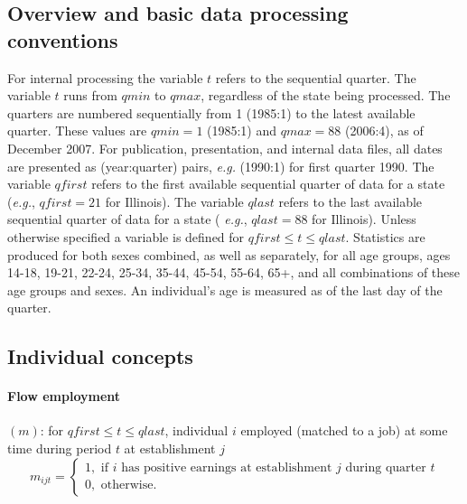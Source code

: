                       

%

\subsection{Overview and basic data processing conventions}

\label{sec:technical:overview}

 For internal processing the variable $t$ refers
to the sequential quarter. The variable $t$ runs from $qmin$ to $qmax$,
regardless of the state being processed. The quarters are numbered
sequentially from 1 (1985:1) to the latest available quarter. These values
are $qmin=1$ (1985:1) and $qmax=88$ (2006:4), as of December 2007. For
publication, presentation, and internal data files, all dates are presented
as (year:quarter) pairs, \textit{e.g.} (1990:1) for first quarter 1990. The
variable $qfirst$ refers to the first available sequential quarter of data
for a state (\textit{e.g.}, $qfirst=21$ for Illinois). The variable $qlast$
refers to the last available sequential quarter of data for a state (\textit{%
e.g.}, $qlast=88$ for Illinois). Unless otherwise specified a variable is
defined for $qfirst\leq t\leq qlast.$ Statistics are produced for both sexes
combined, as well as separately, for all age groups, ages 14-18, 19-21,
22-24, 25-34, 35-44, 45-54, 55-64, 65+, and all combinations of these age
groups and sexes. An individual's age is measured as of the last day of the
quarter.

\subsection{Individual concepts}

\label{sec:technical:individual}

\paragraph{Flow employment}


$\left( m\right) $: for $qfirst\leq t\leq qlast$, individual $i$ employed
(matched to a job) at some time during period $t$ at establishment $j$%
\begin{equation}
m_{ijt}=\left\{ 
\begin{array}{l}
1,%
\text{ if }i\text{ has positive earnings at establishment }j\text{ during
quarter }t \\ 
0,\text{ otherwise.}%
\end{array}%
\right.  \label{eq:mijt}
\end{equation}

